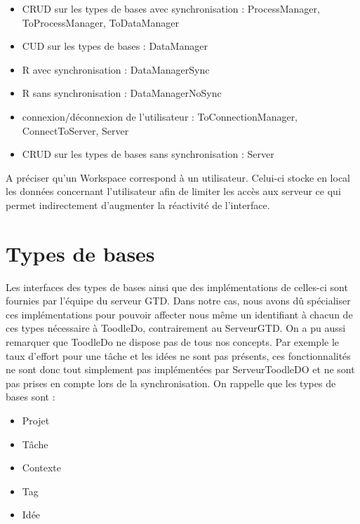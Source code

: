 \begin{itemize}
\item CRUD sur les types de bases avec synchronisation : ProcessManager, ToProcessManager, ToDataManager
\item CUD sur les types de bases : DataManager
\item R avec synchronisation : DataManagerSync
\item R sans synchronisation : DataManagerNoSync
\item connexion/déconnexion de l'utilisateur : ToConnectionManager, ConnectToServer, Server
\item CRUD sur les types de bases sans synchronisation : Server\\
\end{itemize}
\bigskip
A préciser qu'un Workspace correspond à un utilisateur. Celui-ci stocke en local les données concernant l'utilisateur afin de limiter les accès aux serveur ce qui permet indirectement d'augmenter la réactivité de l'interface.

    \section{Types de bases}
    
Les interfaces des types de bases ainsi que des implémentations de celles-ci sont fournies par l'équipe du serveur GTD. Dans notre cas, nous avons dû spécialiser ces implémentations pour pouvoir affecter nous même un identifiant à chacun de ces types nécessaire à ToodleDo, contrairement au ServeurGTD. On a pu aussi remarquer que ToodleDo ne dispose pas de tous nos concepts. Par exemple le taux d'effort pour une tâche et les idées ne sont pas présents, ces fonctionnalités ne sont donc tout simplement pas implémentées par ServeurToodleDO et ne sont pas prises en compte lors de la synchronisation. On rappelle que les types de bases sont : \\

\begin{itemize}
\item Projet
\item Tâche
\item Contexte
\item Tag
\item Idée\\
\end{itemize}

